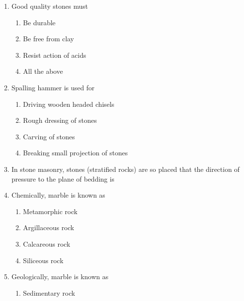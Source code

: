 \documentclass[11pt,a4paper]{article}
\begin{document}
\begin{enumerate}
\\
\item{Good quality stones must}
\begin{enumerate}[label=\Alph*.]
\item{Be durable}
\item{Be free from clay}
\item{Resist action of acids}
\item{All the above}
\end{enumerate}
\item{Spalling hammer is used for}
\begin{enumerate}[label=\Alph*.]
\item{Driving wooden headed chisels}
\item{Rough dressing of stones}
\item{Carving of stones}
\item{Breaking small projection of stones}
\end{enumerate}
\item{In stone masonry, stones (stratified rocks) are so placed that the direction of pressure to the plane of bedding is}
\\
\item{Chemically, marble is known as}
\begin{enumerate}[label=\Alph*.]
\item{Metamorphic rock}
\item{Argillaceous rock}
\item{Calcareous rock}
\item{Siliceous rock}
\end{enumerate}
\item{Geologically, marble is known as}
\begin{enumerate}[label=\Alph*.]
\item{Sedimentary rock}

\end{enumerate}
\end{enumerate}
\end{document}
